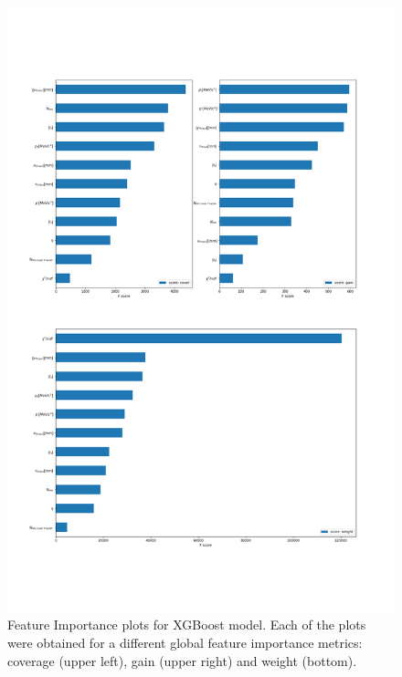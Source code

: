 \begin{figure}[!h]
\centering
\includegraphics[scale=0.8]{figures/feature_importance.png}
\caption{Feature Importance plots for XGBoost model. Each of the plots were obtained for a different global feature importance metrics: coverage (upper left), gain (upper right) and weight (bottom). 
\label{fig:xgboost overal features importance}}
\end{figure}

